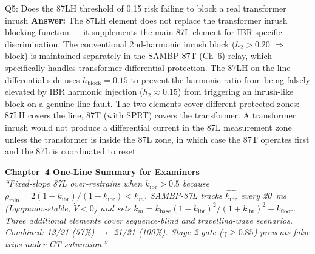 \documentclass[12pt,a4paper]{article}
\newcommand{\kibr}{k_\mathrm{ibr}}
\newcommand{\km}{k_m}
\newcommand{\kbase}{k_\mathrm{base}}
\newcommand{\kfloor}{k_\mathrm{floor}}
\begin{document}
\begin{keybox}{Q5: Does the 87LH threshold of 0.15 risk failing to block a real transformer inrush}
\textbf{Answer:} The 87LH element does not replace the transformer inrush blocking function --- it supplements the main 87L element for IBR-specific discrimination. The conventional 2nd-harmonic inrush block ($h_2 > 0.20$ $\Rightarrow$ block) is maintained separately in the SAMBP-87T (Ch~6) relay, which specifically handles transformer differential protection. The 87LH on the line differential side uses $h_\mathrm{block} = 0.15$ to prevent the harmonic ratio from being falsely elevated by IBR harmonic injection ($h_2 \approx 0.15$) from triggering an inrush-like block on a genuine line fault. The two elements cover different protected zones: 87LH covers the line, 87T (with SPRT) covers the transformer. A transformer inrush would not produce a differential current in the 87L measurement zone unless the transformer is inside the 87L zone, in which case the 87T operates first and the 87L is coordinated to reset.
\end{keybox}

\vspace{1em}
\begin{center}
\begin{tcolorbox}[colback=iitmnavy!10,colframe=iitmnavy,arc=4pt,boxrule=1pt,width=0.88\textwidth]
\centering
\textbf{Chapter~4 One-Line Summary for Examiners}\\[4pt]
\textit{``Fixed-slope 87L over-restrains when $\kibr > 0.5$ because $\rho_\mathrm{min} = 2(1-\kibr)/(1+\kibr) < \km$. SAMBP-87L tracks $\hat{\kibr}$ every 20~ms (Lyapunov-stable, $\dot{V} < 0$) and sets $\km = \kbase(1-\kibr)^2/(1+\kibr)^2 + \kfloor$. Three additional elements cover sequence-blind and travelling-wave scenarios. Combined: 12/21 (57\%) $\to$ 21/21 (100\%). Stage-2 gate ($\gamma \geq 0.85$) prevents false trips under CT saturation.''}
\end{tcolorbox}
\end{center}
\end{document}
